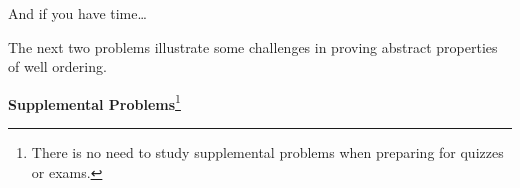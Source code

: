 \documentclass[handout]{mcs}
\begin{document}



\inhandout{\newpage}




\inhandout{\newpage}

And if you have time\dots

\begin{staffnotes}
The next two problems illustrate some challenges in proving abstract
properties of well ordering.  
\end{staffnotes}

\begin{center}
\textbf{Supplemental Problems}\footnote{There is no need to study supplemental
  problems when preparing for quizzes or exams.}
\end{center}


\end{document}
